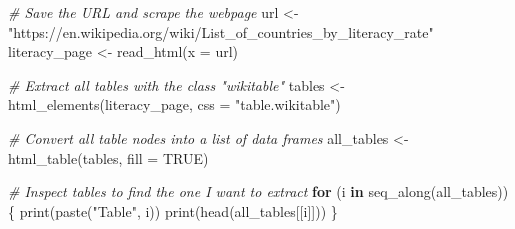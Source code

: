 \documentclass[
]{article}
\newenvironment{Shaded}{\begin{snugshade}}{\end{snugshade}}
\newcommand{\AttributeTok}[1]{\textcolor[rgb]{0.77,0.63,0.00}{#1}}
\newcommand{\CommentTok}[1]{\textcolor[rgb]{0.56,0.35,0.01}{\textit{#1}}}
\newcommand{\ConstantTok}[1]{\textcolor[rgb]{0.00,0.00,0.00}{#1}}
\newcommand{\ControlFlowTok}[1]{\textcolor[rgb]{0.13,0.29,0.53}{\textbf{#1}}}
\newcommand{\FunctionTok}[1]{\textcolor[rgb]{0.00,0.00,0.00}{#1}}
\newcommand{\NormalTok}[1]{#1}
\newcommand{\OtherTok}[1]{\textcolor[rgb]{0.56,0.35,0.01}{#1}}
\newcommand{\StringTok}[1]{\textcolor[rgb]{0.31,0.60,0.02}{#1}}
\begin{document}
\begin{Shaded}
\begin{Highlighting}[]
\CommentTok{\# Save the URL and scrape the webpage}
\NormalTok{url }\OtherTok{\textless{}{-}} \StringTok{"https://en.wikipedia.org/wiki/List\_of\_countries\_by\_literacy\_rate"}
\NormalTok{literacy\_page }\OtherTok{\textless{}{-}} \FunctionTok{read\_html}\NormalTok{(}\AttributeTok{x =}\NormalTok{ url)}

\CommentTok{\# Extract all tables with the class "wikitable"}
\NormalTok{tables }\OtherTok{\textless{}{-}} \FunctionTok{html\_elements}\NormalTok{(literacy\_page, }\AttributeTok{css =} \StringTok{"table.wikitable"}\NormalTok{)}

\CommentTok{\# Convert all table nodes into a list of data frames}
\NormalTok{all\_tables }\OtherTok{\textless{}{-}} \FunctionTok{html\_table}\NormalTok{(tables, }\AttributeTok{fill =} \ConstantTok{TRUE}\NormalTok{)}

\CommentTok{\# Inspect tables to find the one I want to extract}
\ControlFlowTok{for}\NormalTok{ (i }\ControlFlowTok{in} \FunctionTok{seq\_along}\NormalTok{(all\_tables)) \{}
  \FunctionTok{print}\NormalTok{(}\FunctionTok{paste}\NormalTok{(}\StringTok{"Table"}\NormalTok{, i))}
  \FunctionTok{print}\NormalTok{(}\FunctionTok{head}\NormalTok{(all\_tables[[i]]))}
\NormalTok{\}}
\end{Highlighting}
\end{Shaded}
\end{document}
